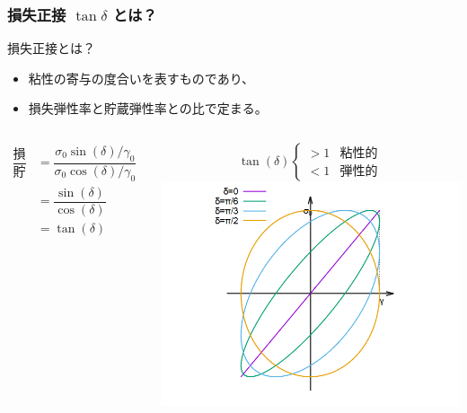 \documentclass[12pt, dvipdfmx]{beamer}
\begin{document}
\begin{frame}
    \frametitle{損失正接 $\tan \delta$ とは？}
		\begin{block}{損失正接とは？}
			\begin{itemize}
				\item 粘性の寄与の度合いを表すものであり、
				\item 損失弾性率と貯蔵弾性率との比で定まる。
			\end{itemize}

			\begin{columns}[c, onlytextwidth]
				\begin{align*}
					\dfrac{\text{損失弾性率}}{\text{貯蔵弾性率}} &= \dfrac{\sigma_0 \sin(\delta)/\gamma_0}{\sigma_0 \cos(\delta)/\gamma_0} \\
					&= \dfrac{\sin(\delta)}{\cos(\delta)} \\
					&= \tan(\delta)
				\end{align*}

				\vspace{-8mm}
				\begin{equation*}
					\tan(\delta)
					\begin{cases}
						> 1 &\text{粘性的} \\
						< 1 &\text{弾性的}
					\end{cases}
				\end{equation*}
				\centering
				\includegraphics[width=\textwidth]{dynamic_rheo/dyn_rheo_lissajou.png}
			\end{columns}
		\end{block}
\end{frame}
\end{document}
